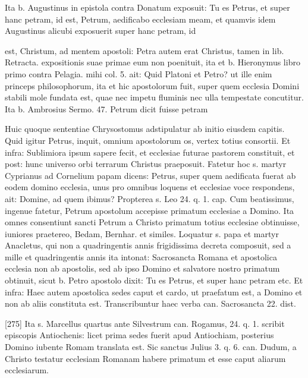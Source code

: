 Ita b. Augustinus in epistola contra Donatum exposuit: Tu es Petrus, et super hanc petram, id est, Petrum, aedificabo ecclesiam meam, et quamvis idem Augustinus alicubi exposuerit super hanc petram, id

est, Christum, ad mentem apostoli: Petra autem erat Christus, tamen in lib. Retracta. expositionis suae primae eum non poenituit, ita et b. Hieronymus libro primo contra Pelagia. mihi col. 5. ait: Quid Platoni et Petro? ut ille enim princeps philosophorum, ita et hic apostolorum fuit, super quem ecclesia Domini stabili mole fundata est, quae nec impetu fluminis nec ulla tempestate concutitur. Ita b. Ambrosius Sermo. 47. Petrum dicit fuisse petram

Huic quoque sententiae Chrysostomus adstipulatur ab initio eiusdem capitis. Quid igitur Petrus, inquit, omnium apostolorum os, vertex totius consortii. Et infra: Sublimiora ipsum sapere fecit, et ecclesiae futurae pastorem constituit, et post: hunc universo orbi terrarum Christus praeposuit. Fatetur hoc s. martyr Cyprianus ad Cornelium papam dicens: Petrus, super quem aedificata fuerat ab eodem domino ecclesia, unus pro omnibus loquens et ecclesiae voce respondens, ait: Domine, ad quem ibimus? Propterea s. Leo 24. q. 1. cap. Cum beatissimus, ingenue fatetur, Petrum apostolum accepisse primatum ecclesiae a Domino. Ita omnes consentiunt sancti Petrum a Christo primatum totius ecclesiae obtinuisse, iuniores praetereo, Bedam, Bernhar. et similes. Loquatur s. papa et martyr Anacletus, qui non a quadringentis annis frigidissima decreta composuit, sed a mille et quadringentis annis ita intonat: Sacrosancta Romana et apostolica ecclesia non ab apostolis, sed ab ipso Domino et salvatore nostro primatum obtinuit, sicut b. Petro apostolo dixit: Tu es Petrus, et super hanc petram etc. Et infra: Haec autem apostolica sedes caput et cardo, ut praefatum est, a Domino et non ab aliis constituta est. Transcribuntur haec verba can. Sacrosancta 22. dist.

[275] Ita s. Marcellus quartus ante Silvestrum can. Rogamus, 24. q. 1. scribit episcopis Antiochenis: licet prima sedes fuerit apud Antiochiam, posterius Domino iubente Romam translata est. Sic sanctus Julius 3. q. 6. can. Dudum, a Christo testatur ecclesiam Romanam habere primatum et esse caput aliarum ecclesiarum.

